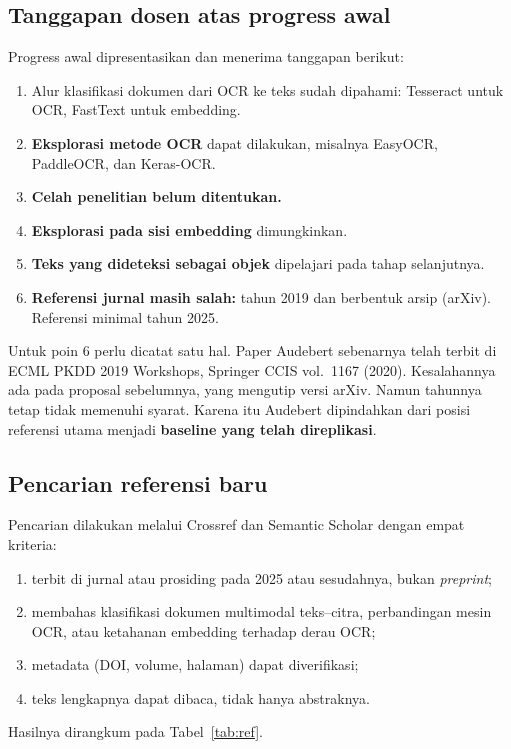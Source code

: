 \documentclass[11pt,a4paper]{article}
\begin{document}
\subsection{Tanggapan dosen atas progress awal}

Progress awal dipresentasikan dan menerima tanggapan berikut:

\begin{enumerate}
  \item Alur klasifikasi dokumen dari OCR ke teks sudah dipahami: Tesseract untuk OCR,
  FastText untuk embedding.
  \item \textbf{Eksplorasi metode OCR} dapat dilakukan, misalnya EasyOCR, PaddleOCR, dan
  Keras-OCR.
  \item \textbf{Celah penelitian belum ditentukan.}
  \item \textbf{Eksplorasi pada sisi embedding} dimungkinkan.
  \item \textbf{Teks yang dideteksi sebagai objek} dipelajari pada tahap selanjutnya.
  \item \textbf{Referensi jurnal masih salah:} tahun 2019 dan berbentuk arsip (arXiv).
  Referensi minimal tahun 2025.
\end{enumerate}

Untuk poin 6 perlu dicatat satu hal. Paper Audebert sebenarnya telah terbit di ECML
PKDD 2019 Workshops, Springer CCIS vol.~1167 (2020). Kesalahannya ada pada proposal
sebelumnya, yang mengutip versi arXiv. Namun tahunnya tetap tidak memenuhi syarat. Karena
itu Audebert dipindahkan dari posisi referensi utama menjadi \textbf{baseline yang telah
direplikasi}.

\subsection{Pencarian referensi baru}

Pencarian dilakukan melalui Crossref dan Semantic Scholar dengan empat kriteria:
\begin{enumerate}[label=(\roman*)]
  \item terbit di jurnal atau prosiding pada 2025 atau sesudahnya, bukan
  \textit{preprint};
  \item membahas klasifikasi dokumen multimodal teks--citra, perbandingan mesin OCR, atau
  ketahanan embedding terhadap derau OCR;
  \item metadata (DOI, volume, halaman) dapat diverifikasi;
  \item teks lengkapnya dapat dibaca, tidak hanya abstraknya.
\end{enumerate}
Hasilnya dirangkum pada Tabel~\ref{tab:ref}.
\end{document}

